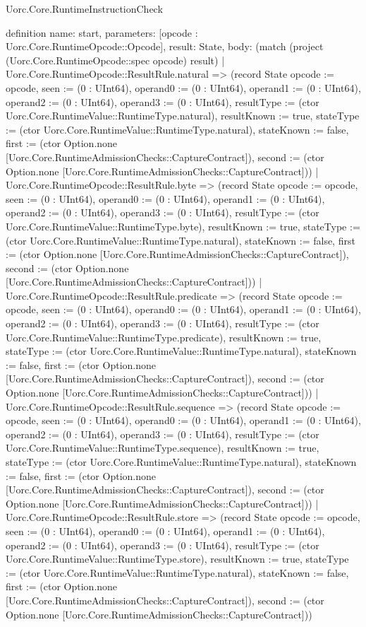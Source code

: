 \begin{lexlean}{Uorc.Core.RuntimeInstructionCheck}
\begin{semanticmodule}
definition{
  name: start,
  parameters: [opcode : Uorc.Core.RuntimeOpcode::Opcode],
  result: State,
  body: (match (project (Uorc.Core.RuntimeOpcode::spec opcode) result)
    | Uorc.Core.RuntimeOpcode::ResultRule.natural => (record State {opcode := opcode, seen := (0 : UInt64), operand0 := (0 : UInt64), operand1 := (0 : UInt64), operand2 := (0 : UInt64), operand3 := (0 : UInt64), resultType := (ctor Uorc.Core.RuntimeValue::RuntimeType.natural), resultKnown := true, stateType := (ctor Uorc.Core.RuntimeValue::RuntimeType.natural), stateKnown := false, first := (ctor Option.none [Uorc.Core.RuntimeAdmissionChecks::CaptureContract]), second := (ctor Option.none [Uorc.Core.RuntimeAdmissionChecks::CaptureContract])})
    | Uorc.Core.RuntimeOpcode::ResultRule.byte => (record State {opcode := opcode, seen := (0 : UInt64), operand0 := (0 : UInt64), operand1 := (0 : UInt64), operand2 := (0 : UInt64), operand3 := (0 : UInt64), resultType := (ctor Uorc.Core.RuntimeValue::RuntimeType.byte), resultKnown := true, stateType := (ctor Uorc.Core.RuntimeValue::RuntimeType.natural), stateKnown := false, first := (ctor Option.none [Uorc.Core.RuntimeAdmissionChecks::CaptureContract]), second := (ctor Option.none [Uorc.Core.RuntimeAdmissionChecks::CaptureContract])})
    | Uorc.Core.RuntimeOpcode::ResultRule.predicate => (record State {opcode := opcode, seen := (0 : UInt64), operand0 := (0 : UInt64), operand1 := (0 : UInt64), operand2 := (0 : UInt64), operand3 := (0 : UInt64), resultType := (ctor Uorc.Core.RuntimeValue::RuntimeType.predicate), resultKnown := true, stateType := (ctor Uorc.Core.RuntimeValue::RuntimeType.natural), stateKnown := false, first := (ctor Option.none [Uorc.Core.RuntimeAdmissionChecks::CaptureContract]), second := (ctor Option.none [Uorc.Core.RuntimeAdmissionChecks::CaptureContract])})
    | Uorc.Core.RuntimeOpcode::ResultRule.sequence => (record State {opcode := opcode, seen := (0 : UInt64), operand0 := (0 : UInt64), operand1 := (0 : UInt64), operand2 := (0 : UInt64), operand3 := (0 : UInt64), resultType := (ctor Uorc.Core.RuntimeValue::RuntimeType.sequence), resultKnown := true, stateType := (ctor Uorc.Core.RuntimeValue::RuntimeType.natural), stateKnown := false, first := (ctor Option.none [Uorc.Core.RuntimeAdmissionChecks::CaptureContract]), second := (ctor Option.none [Uorc.Core.RuntimeAdmissionChecks::CaptureContract])})
    | Uorc.Core.RuntimeOpcode::ResultRule.store => (record State {opcode := opcode, seen := (0 : UInt64), operand0 := (0 : UInt64), operand1 := (0 : UInt64), operand2 := (0 : UInt64), operand3 := (0 : UInt64), resultType := (ctor Uorc.Core.RuntimeValue::RuntimeType.store), resultKnown := true, stateType := (ctor Uorc.Core.RuntimeValue::RuntimeType.natural), stateKnown := false, first := (ctor Option.none [Uorc.Core.RuntimeAdmissionChecks::CaptureContract]), second := (ctor Option.none [Uorc.Core.RuntimeAdmissionChecks::CaptureContract])})
}
\end{semanticmodule}
\end{lexlean}
